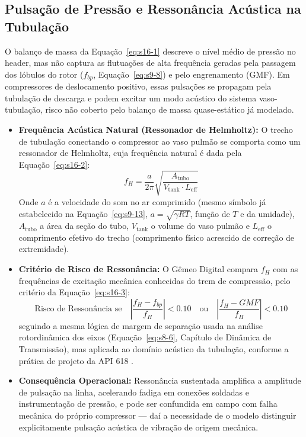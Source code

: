 \documentclass[12pt,a4paper]{article}
\numberwithin{equation}{section}
\numberwithin{table}{section}
\numberwithin{figure}{section}
\begin{document}
\subsection{Pulsação de Pressão e Ressonância Acústica na Tubulação}
O balanço de massa da Equação~\eqref{eq:s16-1} descreve o nível médio de pressão no header, mas não captura as flutuações de alta frequência geradas pela passagem dos lóbulos do rotor ($f_{bp}$, Equação~\eqref{eq:s9-8}) e pelo engrenamento (GMF). Em compressores de deslocamento positivo, essas pulsações se propagam pela tubulação de descarga e podem excitar um modo acústico do sistema vaso-tubulação, risco não coberto pelo balanço de massa quase-estático já modelado.
\begin{itemize}
	\item \textbf{Frequência Acústica Natural (Ressonador de Helmholtz):} O trecho de tubulação conectando o compressor ao vaso pulmão se comporta como um ressonador de Helmholtz, cuja frequência natural é dada pela Equação~\eqref{eq:s16-2}:
	\begin{equation}\label{eq:s16-2}
 f_H = \frac{a}{2\pi} \sqrt{\frac{A_{\text{tubo}}}{V_{\text{tank}} \cdot L_{\text{eff}}}}
\end{equation}
	Onde $a$ é a velocidade do som no ar comprimido (mesmo símbolo já estabelecido na Equação~\eqref{eq:s9-13}, $a=\sqrt{\gamma R T}$, função de $T$ e da umidade), $A_{\text{tubo}}$ a área da seção do tubo, $V_{\text{tank}}$ o volume do vaso pulmão e $L_{\text{eff}}$ o comprimento efetivo do trecho (comprimento físico acrescido de correção de extremidade).
	\item \textbf{Critério de Risco de Ressonância:} O Gêmeo Digital compara $f_H$ com as frequências de excitação mecânica conhecidas do trem de compressão, pelo critério da Equação~\eqref{eq:s16-3}:
	\begin{equation}\label{eq:s16-3}
 \text{Risco de Ressonância se} \quad \left| \frac{f_H - f_{bp}}{f_H} \right| < 0.10 \quad \text{ou} \quad \left| \frac{f_H - GMF}{f_H} \right| < 0.10 
\end{equation}
	seguindo a mesma lógica de margem de separação usada na análise rotordinâmica dos eixos (Equação~\eqref{eq:s8-6}, Capítulo de Dinâmica de Transmissão), mas aplicada ao domínio acústico da tubulação, conforme a prática de projeto da API 618 \cite{api618}.
	\item \textbf{Consequência Operacional:} Ressonância sustentada amplifica a amplitude de pulsação na linha, acelerando fadiga em conexões soldadas e instrumentação de pressão, e pode ser confundida em campo com falha mecânica do próprio compressor — daí a necessidade de o modelo distinguir explicitamente pulsação acústica de vibração de origem mecânica.

\end{itemize}
\end{document}
